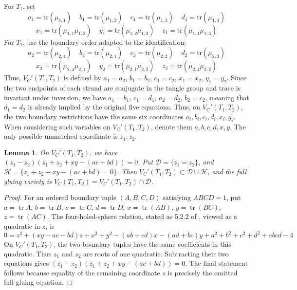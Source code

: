 \documentclass{article}
\DeclareMathOperator{\tr}{tr}
\theoremstyle{plain}
\theoremstyle{definition}
\theoremstyle{plain}
\theoremstyle{plain}
\theoremstyle{plain}
\newtheorem{lemma}[theorem]{Lemma}
\theoremstyle{remark}
\theoremstyle{remark}
\theoremstyle{plain}
\theoremstyle{plain}
\newcounter{main}
\theoremstyle{plain}
\theoremstyle{plain}
\begin{document}
For $T_1$, set
\begin{equation*}
	a_1 = \mathrm{tr}(\mu_{1, 1}) \ \ \ \ \ b_1 = \mathrm{tr}(\mu_{1, 2}) \ \ \ \ \ c_1 = \mathrm{tr}(\mu_{1, 3}) \ \ \ \ \ d_1 = \mathrm{tr}(\mu_{1, 4})
\end{equation*}
\begin{equation*}
	x_1 = \mathrm{tr}(\mu_{1, 1}\mu_{1, 2}) \ \ \ \ \ y_1 = \mathrm{tr}(\mu_{1, 2}\mu_{1, 3}) \ \ \ \ \ z_1 = \mathrm{tr}(\mu_{1, 1}\mu_{1, 3})
\end{equation*}
For $T_2$, use the boundary order adapted to the identification:
\begin{equation*}
	a_2 = \mathrm{tr}(\mu_{2, 4}) \ \ \ \ \ b_2 = \mathrm{tr}(\mu_{2, 1}) \ \ \ \ \ c_2 = \mathrm{tr}(\mu_{2, 2}) \ \ \ \ \ d_2 = \mathrm{tr}(\mu_{2, 3})
\end{equation*}
\begin{equation*}
	x_2 = \mathrm{tr}(\mu_{2, 4}\mu_{2, 1}) \ \ \ \ \ y_2 = \mathrm{tr}(\mu_{2, 1}\mu_{2, 2}) \ \ \ \ \ z_2 = \mathrm{tr}(\mu_{2, 4}\mu_{2, 2})
\end{equation*}
Thus, $V_C'(T_1, T_2)$ is defined by $a_1 = a_2$, $b_1 = b_2$, $c_1 = c_2$, $x_1 = x_2$, $y_1 = y_2$. Since the two endpoints of each strand are conjugate in the tangle group and trace is invariant under inversion, we have $a_1 = b_1$, $c_1 = d_1$, $a_2 = d_2$, $b_2 = c_2$, meaning that $d_1 = d_2$ is already implied by the original five equations. Thus, on $V_C'(T_1, T_2)$, the two boundary restrictions have the same six coordinates $a_i, b_i, c_i, d_i, x_i, y_i$. When considering such variables on $V_C'(T_1, T_2)$, denote them $a, b, c, d, x, y$. The only possible unmatched coordinate is $z_1, z_2$. 

\begin{lemma}\label{lma:branches}
On $V_C'(T_1, T_2)$, we have $(z_1 - z_2)(z_1 + z_2 + xy - (ac + bd)) = 0$. Put $\mathcal D = \{z_1 = z_2\}$, and $\mathcal H = \{z_1 + z_2 + xy - (ac + bd) = 0\}$. Then $V_C'(T_1, T_2) \subset \mathcal D \cup \mathcal H$, and the full gluing variety is $V_C(T_1, T_2) = V_C'(T_1, T_2) \cap \mathcal D$. 
\end{lemma}

\begin{proof}
For an ordered boundary tuple $(A, B, C, D)$ satisfying $ABCD = 1$, put $a = \tr A$, $b = \tr B$, $c = \tr C$, $d = \tr D$, $x = \tr(AB)$, $y = \tr(BC)$, $z = \tr(AC)$. The four-holed-sphere relation, stated as 5.2.2 of \cite{goldman}, viewed as a quadratic in $z$, is
\begin{equation*}
	0 = z^2 + (xy-ac-bd)z+x^2+y^2 - (ab+cd)x-(ad+bc)y + a^2 + b^2 + c^2 + d^2 + abcd - 4
\end{equation*}
On $V_C'(T_1, T_2)$, the two boundary tuples have the same coefficients in this quadratic. Thus $z_1$ and $z_2$ are roots of one quadratic. Subtracting their two equations gives $(z_1 - z_2)(z_1 + z_2 + xy - (ac+bd)) = 0$. The final statement follows because equality of the remaining coordinate $z$ is precisely the omitted full-gluing equation. 
\end{proof}
\end{document}
